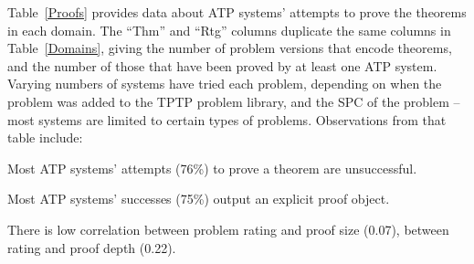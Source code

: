\documentclass[runningheads]{llncs}
\newenvironment{packed_itemize}{
\vspace*{-0.2em}
\begin{itemize}
\setlength{\partopsep}{0pt}
\setlength{\itemsep}{1pt}
\setlength{\parskip}{0pt}
\setlength{\parsep}{0pt}
}{\end{itemize}}
\begin{document}
Table~\ref{Proofs} provides data about ATP systems' attempts to prove the theorems in each domain.
The ``Thm'' and ``Rtg'' columns duplicate the same columns in Table~\ref{Domains}, giving the
number of problem versions that encode theorems, and the number of those that have been proved
by at least one ATP system.
Varying numbers of systems have tried each problem, depending on when the problem was added to
the TPTP problem library, and the SPC of the problem -- most systems are limited to certain types
of problems.
Observations from that table include:
\begin{packed_itemize}
\item Most ATP systems' attempts (76\%) to prove a theorem are unsuccessful.
\item Most ATP systems' successes (75\%) output an explicit proof object.
\item There is low correlation between problem rating and proof size (0.07),
      between rating and proof depth (0.22).
\end{packed_itemize}
\end{document}
